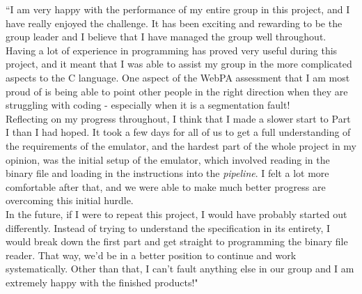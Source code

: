 \documentclass[11pt]{article}
\newenvironment{myquote}%
  {\list{}{\leftmargin=0.0in\rightmargin=0.0in}\item[]}%
  {\endlist}
\begin{document}
\begin{myquote}\noindent
``I am very happy with the performance of my entire group in this project, and I have really enjoyed the challenge. It has been exciting and rewarding to be the group leader and I believe that I have managed the group well throughout. Having a lot of experience in programming has proved very useful during this project, and it meant that I was able to assist my group in the more complicated aspects to the C language. One aspect of the WebPA assessment that I am most proud of is being able to point other people in the right direction when they are struggling with coding - especially when it is a segmentation fault!
\\Reflecting on my progress throughout, I think that I made a slower start to Part I than I had hoped. It took a few days for all of us to get a full understanding of the requirements of the emulator, and the hardest part of the whole project in my opinion, was the initial setup of the emulator, which involved reading in the binary file and loading in the instructions into the \emph{pipeline}. I felt a lot more comfortable after that, and we were able to make much better progress are overcoming this initial hurdle.
\\In the future, if I were to repeat this project, I would have probably started out differently. Instead of trying to understand the  specification in its entirety, I would break down the first part and get straight to programming the binary file reader. That way, we'd be in a better position to continue and work systematically. Other than that, I can't fault anything else in our group and I am extremely happy with the finished products!"
\end{myquote}
\end{document}
